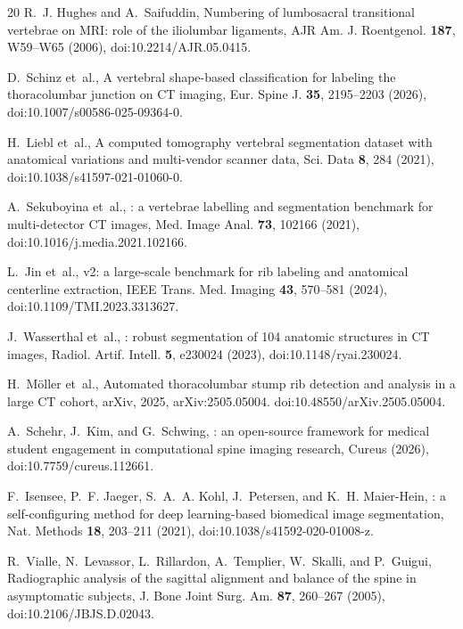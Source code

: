 \documentclass[aapm,mph,amsmath,amssymb,reprint]{revtex4-2}
\begin{document}
\begin{thebibliography}{20}
R.~J. Hughes and A.~Saifuddin,
\newblock Numbering of lumbosacral transitional vertebrae on {MRI}: role of the iliolumbar ligaments,
\newblock AJR Am. J. Roentgenol. {\bf 187}, W59--W65 (2006),
\newblock doi:10.2214/AJR.05.0415.

D.~Schinz et~al.,
\newblock A vertebral shape-based classification for labeling the thoracolumbar junction on {CT} imaging,
\newblock Eur. Spine J. {\bf 35}, 2195--2203 (2026),
\newblock doi:10.1007/s00586-025-09364-0.

H.~Liebl et~al.,
\newblock A computed tomography vertebral segmentation dataset with anatomical variations and multi-vendor scanner data,
\newblock Sci. Data {\bf 8}, 284 (2021),
\newblock doi:10.1038/s41597-021-01060-0.

A.~Sekuboyina et~al.,
: a vertebrae labelling and segmentation benchmark for multi-detector {CT} images,
\newblock Med. Image Anal. {\bf 73}, 102166 (2021),
\newblock doi:10.1016/j.media.2021.102166.

L.~Jin et~al.,
 v2: a large-scale benchmark for rib labeling and anatomical centerline extraction,
\newblock IEEE Trans. Med. Imaging {\bf 43}, 570--581 (2024),
\newblock doi:10.1109/TMI.2023.3313627.

J.~Wasserthal et~al.,
: robust segmentation of 104 anatomic structures in {CT} images,
\newblock Radiol. Artif. Intell. {\bf 5}, e230024 (2023),
\newblock doi:10.1148/ryai.230024.

H.~M{\"o}ller et~al.,
\newblock Automated thoracolumbar stump rib detection and analysis in a large {CT} cohort,
\newblock arXiv, 2025,
\newblock arXiv:2505.05004. doi:10.48550/arXiv.2505.05004.

A.~Schehr, J.~Kim, and G.~Schwing,
: an open-source framework for medical student engagement in computational spine imaging research,
\newblock Cureus  (2026),
\newblock doi:10.7759/cureus.112661.

F.~Isensee, P.~F. Jaeger, S.~A.~A. Kohl, J.~Petersen, and K.~H. Maier-Hein,
: a self-configuring method for deep learning-based biomedical image segmentation,
\newblock Nat. Methods {\bf 18}, 203--211 (2021),
\newblock doi:10.1038/s41592-020-01008-z.

R.~Vialle, N.~Levassor, L.~Rillardon, A.~Templier, W.~Skalli, and P.~Guigui,
\newblock Radiographic analysis of the sagittal alignment and balance of the spine in asymptomatic subjects,
\newblock J. Bone Joint Surg. Am. {\bf 87}, 260--267 (2005),
\newblock doi:10.2106/JBJS.D.02043.


\end{thebibliography}
\end{document}
